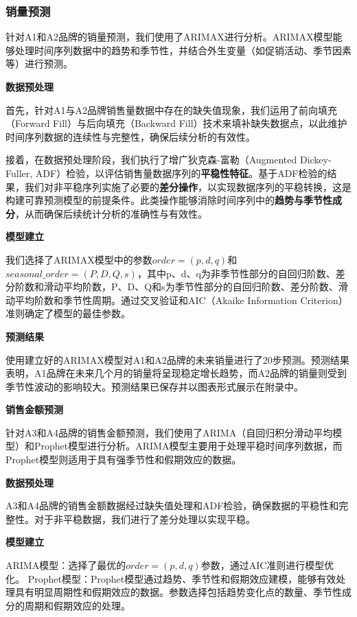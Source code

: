 \documentclass[a4paper]{article}
\begin{document}
	\subsubsection{销量预测}
	
	针对A1和A2品牌的销量预测，我们使用了ARIMAX进行分析。ARIMAX模型能够处理时间序列数据中的趋势和季节性，并结合外生变量（如促销活动、季节因素等）进行预测。
	
	\textbf{数据预处理}
	
首先，针对A1与A2品牌销售量数据中存在的缺失值现象，我们运用了前向填充（Forward Fill）与后向填充（Backward Fill）技术来填补缺失数据点，以此维护时间序列数据的连续性与完整性，确保后续分析的有效性。

接着，在数据预处理阶段，我们执行了增广狄克森-富勒（Augmented Dickey-Fuller, ADF）检验，以评估销售量数据序列的\textbf{平稳性特征}。基于ADF检验的结果，我们对非平稳序列实施了必要的\textbf{差分操作}，以实现数据序列的平稳转换，这是构建可靠预测模型的前提条件。此类操作能够消除时间序列中的\textbf{趋势与季节性成分}，从而确保后续统计分析的准确性与有效性。
	
	\textbf{模型建立}
	
	我们选择了ARIMAX模型中的参数$order=(p,d,q)$和$seasonal\_order=(P,D,Q,s)$，其中p、d、q为非季节性部分的自回归阶数、差分阶数和滑动平均阶数，P、D、Q和s为季节性部分的自回归阶数、差分阶数、滑动平均阶数和季节性周期。通过交叉验证和AIC（Akaike Information Criterion）准则确定了模型的最佳参数。

	\textbf{预测结果}
	
	使用建立好的ARIMAX模型对A1和A2品牌的未来销量进行了20步预测。预测结果表明，A1品牌在未来几个月的销量将呈现稳定增长趋势，而A2品牌的销量则受到季节性波动的影响较大。预测结果已保存并以图表形式展示在附录中。

	\textbf{销售金额预测}

	针对A3和A4品牌的销售金额预测，我们使用了ARIMA（自回归积分滑动平均模型）和Prophet模型进行分析。ARIMA模型主要用于处理平稳时间序列数据，而Prophet模型则适用于具有强季节性和假期效应的数据。

	\textbf{数据预处理}

	A3和A4品牌的销售金额数据经过缺失值处理和ADF检验，确保数据的平稳性和完整性。对于非平稳数据，我们进行了差分处理以实现平稳。
	
	\textbf{模型建立}
	
	ARIMA模型：选择了最优的$order=(p,d,q)$参数，通过AIC准则进行模型优化。
	Prophet模型：Prophet模型通过趋势、季节性和假期效应建模，能够有效处理具有明显周期性和假期效应的数据。参数选择包括趋势变化点的数量、季节性成分的周期和假期效应的处理。
	
\end{document}
